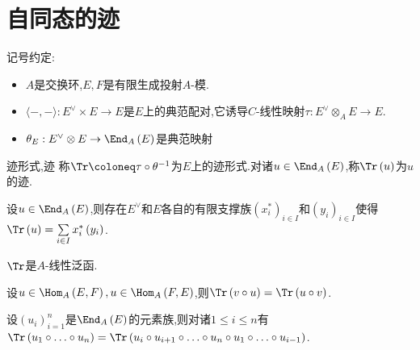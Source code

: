 \section{自同态的迹}

记号约定:

\begin{itemize}
	\item $A$是交换环,$E,F$是有限生成投射$A$-模.
	\item $\langle -,-\rangle:E^{\vee}\times E\to E$是$E$上的典范配对,它诱导$C$-线性映射$\tau:E^{\vee}\otimes_{A}E\to E$.
	\item $\theta_{E}:E^{\vee}\otimes E\to\End_{A}\left(E\right)$是典范映射
\end{itemize}

\begin{definition}{迹形式,迹}{}
	称$\Tr\coloneq\tau\circ\theta^{-1}$为$E$上的迹形式.对诸$u\in\End_{A}\left(E\right)$,称$\Tr\left(u\right)$为$u$的迹.
\end{definition}

\begin{proposition}{}{}
	设$u\in\End_{A}\left(E\right)$,则存在$E^{\vee}$和$E$各自的有限支撑族$\left(x_{i}^{\ast}\right)_{i\in I}$和$\left(y_{i}\right)_{i\in I}$使得$\Tr\left(u\right)=\sum\limits_{i\in I}x_{i}^{\ast}\left(y_{i}\right)$.
\end{proposition}

\begin{proposition}{}{}
	$\Tr$是$A$-线性泛函.
\end{proposition}

\begin{proposition}{}{}
	设$u\in\Hom_{A}\left(E,F\right),u\in\Hom_{A}\left(F,E\right)$,则$\Tr\left(v\circ u\right)=\Tr\left(u\circ v\right)$.
\end{proposition}

\begin{corollary}{}{}
	设$\left(u_{i}\right)_{i=1}^{n}$是$\End_{A}\left(E\right)$的元素族,则对诸$1\leq i\leq n$有$\Tr\left(u_{1}\circ\ldots\circ u_{n}\right)=\Tr\left(u_{i}\circ u_{i+1}\circ\ldots\circ u_{n}\circ u_{1}\circ\ldots\circ u_{i-1}\right)$.
\end{corollary}